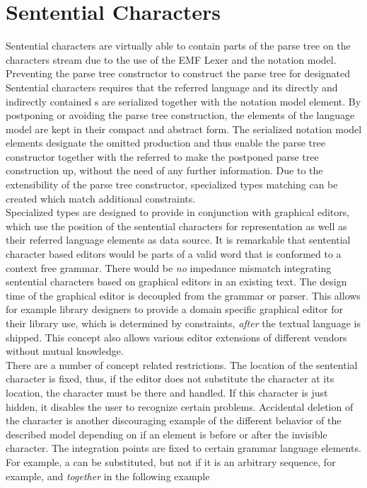 \section{Sentential Characters}
Sentential characters are virtually able to contain parts of the parse tree on the characters stream due to the use of the EMF Lexer and the notation model. Preventing the parse tree constructor to construct the parse tree for designated Sentential characters requires that the referred language  and its directly and indirectly contained s are serialized together with the notation model element. By postponing or avoiding the parse tree construction, the elements of the language model are kept in their compact and abstract form. The serialized notation model elements designate the omitted production and thus enable the parse tree constructor together with the referred  to make the postponed parse tree construction up, without the need of any further information. Due to the extensibility of the parse tree constructor, specialized types matching can be created which match additional constraints.  \\
Specialized types are designed to provide in conjunction with graphical editors, which use the position of the sentential characters for representation as well as their referred language elements as data source. It is remarkable that sentential character based editors would be parts of a valid word that is conformed to a context free grammar. There would be \emph{no} impedance mismatch integrating sentential characters based on graphical editors in an existing text. The design time of the graphical editor is decoupled from the grammar or parser. This allows for example library designers to provide a domain specific graphical editor for their library use, which is determined by constraints, \emph{after} the textual language is shipped. This concept also allows various editor extensions of different vendors without mutual knowledge.\\
There are a number of concept related restrictions. The location of the sentential character is fixed, thus, if the editor does not substitute the character at its location, the character must be there and handled. If this character is just hidden, it disables the user to recognize certain problems. Accidental deletion of the character is another discouraging example of the different behavior of the described model depending on if an element is before or after the invisible character. The integration points are fixed to certain grammar language elements. For example, a  can be substituted, but not if it is an arbitrary sequence, for example,  and  \emph{together} in the following example\\
